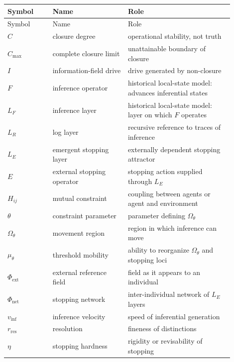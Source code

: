 \begin{longtable}{@{}p{0.18\linewidth}p{0.30\linewidth}p{0.42\linewidth}@{}}
\toprule
Symbol & Name & Role \\
\midrule
\endfirsthead
\toprule
Symbol & Name & Role \\
\midrule
\endhead
$C$ & closure degree & operational stability, not truth \\
$C_{\max}$ & complete closure limit & unattainable boundary of closure \\
$I$ & information-field drive & drive generated by non-closure \\
$F$ & inference operator & historical local-state model: advances inferential states \\
$L_F$ & inference layer & historical local-state model: layer on which $F$ operates \\
$L_R$ & log layer & recursive reference to traces of inference \\
$L_E$ & emergent stopping layer & externally dependent stopping attractor \\
$E$ & external stopping operator & stopping action supplied through $L_E$ \\
$H_{ij}$ & mutual constraint & coupling between agents or agent and environment \\
$\theta$ & constraint parameter & parameter defining $\Omega_\theta$ \\
$\Omega_\theta$ & movement region & region in which inference can move \\
$\mu_\theta$ & threshold mobility & ability to reorganize $\Omega_\theta$ and stopping loci \\
$\Phi_{\text{ext}}$ & external reference field & field as it appears to an individual \\
$\Phi_{\text{net}}$ & stopping network & inter-individual network of $L_E$ layers \\
$v_{\text{inf}}$ & inference velocity & speed of inferential generation \\
$r_{\text{res}}$ & resolution & fineness of distinctions \\
$\eta$ & stopping hardness & rigidity or revisability of stopping \\
\bottomrule
\end{longtable}

\bigskip
